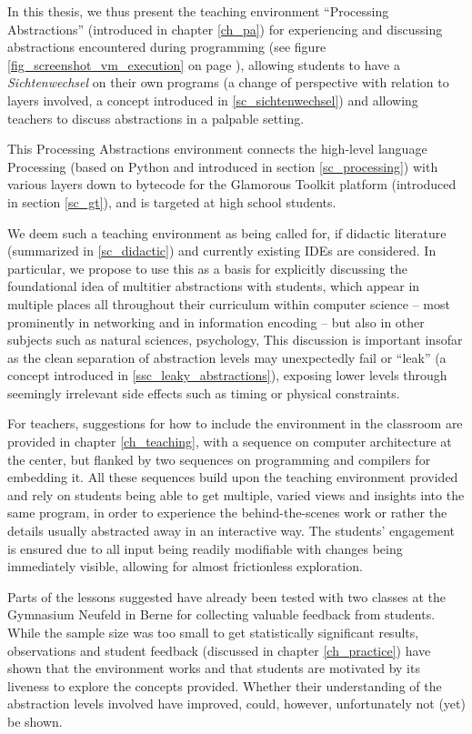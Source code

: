 In this thesis, we thus present the teaching environment ``Processing Abstractions'' (introduced in chapter \ref{ch_pa}) for experiencing and discussing abstractions encountered during programming (see \eg figure \ref{fig_screenshot_vm_execution} on page \pageref{fig_screenshot_vm_execution}), allowing students to have a \emph{Sichtenwechsel} on their own programs (\ie a change of perspective with relation to layers involved, a concept introduced in \ref{sc_sichtenwechsel}) and allowing teachers to discuss abstractions in a palpable setting.

This Processing Abstractions environment connects the high-level language Processing (based on Python and introduced in section \ref{sc_processing}) with various layers down to bytecode for the Glamorous Toolkit platform (introduced in section \ref{sc_gt}), and is targeted at high school students.

We deem such a teaching environment as being called for, if didactic literature (summarized in \ref{sc_didactic}) and currently existing \acp{IDE} are considered. In particular, we propose to use this as a basis for explicitly discussing the foundational idea of multitier abstractions with students, which appear in multiple places all throughout their curriculum within computer science -- most prominently in networking and in information encoding -- but also in other subjects such as natural sciences, psychology, \etc This discussion is important insofar as the clean separation of abstraction levels may unexpectedly fail or ``leak'' (a concept introduced in \ref{ssc_leaky_abstractions}), exposing lower levels through seemingly irrelevant side effects such as timing or physical constraints.

For teachers, suggestions for how to include the environment in the classroom are provided in chapter \ref{ch_teaching}, with a sequence on computer architecture at the center, but flanked by two sequences on programming and compilers for embedding it. All these sequences build upon the teaching environment provided and rely on students being able to get multiple, varied views and insights into the same program, in order to experience the behind-the-scenes work or rather the details usually abstracted away in an interactive way. The students' engagement is ensured due to all input being readily modifiable with changes being immediately visible, allowing for almost frictionless exploration.

Parts of the lessons suggested have already been tested with two classes at the Gymnasium Neufeld in Berne for collecting valuable feedback from students. While the sample size was too small to get statistically significant results, observations and student feedback (discussed in chapter \ref{ch_practice}) have shown that the environment works and that students are motivated by its liveness to explore the concepts provided. Whether their understanding of the abstraction levels involved have improved, could, however, unfortunately not (yet) be shown.

